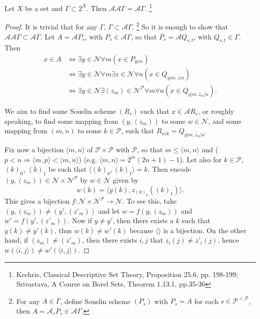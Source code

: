 \begin{proposition} \label{P:souslin_idem}
Let $X$ be a set and $\Gamma\subset 2^X$. Then 
$\mathcal{A}\mathcal{A}\Gamma=\mathcal{A}\Gamma$.
  \footnote{Kechris, Classical Descriptive Set Theory, Proposition 25.6, 
    pp. 198-199; Srivastava, A Course on Borel Sets, Theorem 1.13.1, pp.35-36}
\end{proposition}
\begin{proof}
It is trivial that for any $\Gamma$, $\Gamma\subset\mathcal{A}\Gamma$. 
\footnote{
  For any $A\in\Gamma$, define Souslin scheme $(P_s)$ with $P_s=A$ for each
  $s\in \mathcal{P}^{<\mathcal{P}}$, then 
  $A=\mathcal{A}_s P_s\in\mathcal{A}\Gamma$.
}
So it is enough to show that 
$\mathcal{A}\mathcal{A}\Gamma\subset \mathcal{A}\Gamma$.
Let $A=\mathcal{A}P_s$, with $P_s\in\mathcal{A}\Gamma$, so that 
$P_s=\mathcal{A}Q_{s,t}$, with $Q_{s,t}\in\Gamma$. Then
\begin{align*}
  x\in A 
    & \iff \exists y\in\mathcal{N} \forall m (x\in P_{y|m}) \\
    & \iff \exists y\in\mathcal{N} \forall m 
        \exists z\in\mathcal{N} \forall n (x\in Q_{y|m, z|n}) \\
    & \iff \exists y\in\mathcal{N} \exists(z_m)\in\mathcal{N}^{\mathcal{P}}
        \forall m \forall n (x\in Q_{y|m, z_m|n}).
\end{align*}

We aim to find some Souslin scheme $(R_s)$ such that 
$x\in\mathcal{A}R_s$, or roughly speaking, to find some mapping
from $(y,(z_m))$ to some $w\in\mathcal{N}$, and some mapping from
$(m,n)$ to some $k\in\mathcal{P}$, such that $R_{w|k}=Q_{y|m,z_m|n}$.

Fix now a bijection $\langle m,n\rangle$ of $\mathcal{P}\times \mathcal{P}$ 
with $\mathcal{P}$, so that $m\le\langle m,n \rangle$ and 
($p<n \Rightarrow \langle m,p \rangle < \langle m,n \rangle$)
(e.g. $\langle m,n \rangle = 2^m (2n+1) - 1$). Let also for $k\in \mathcal{P}$,
$(k)_0$, $(k)_1$ be such that $\langle (k)_0,(k)_1 \rangle=k$. Then encode
$(y,(z_m))\in \mathcal{N}\times\mathcal{N}^{\mathcal{P}}$ by $w\in\mathcal{N}$
given by 
\[
  w(k)=\langle y(k), z_{(k)_0}((k)_1)\rangle. 
\]
This gives a bijection 
$f:\mathcal{N}\times\mathcal{N}^{\mathcal{P}}\to\mathcal{N}$. 
To see this, take $(y,(z_m))\neq (y',(z'_m))$ and let 
$w=f(y,(z_m))$ and $w'=f(y',(z'_m))$. Now if
$y\neq y'$, then there exists a $k$ such that $y(k)\neq y'(k)$, thus
$w(k)\neq w'(k)$ because $\langle\rangle$ is a bijection. On the other hand,
if $(z_m)\neq (z'_m)$, then there exists $i,j$ that $z_i(j)\neq z'_i(j)$,
hence $w(\langle i,j\rangle)\neq w'(\langle i,j\rangle)$.


\end{proof}
